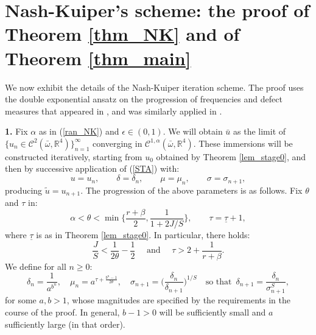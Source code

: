 \documentclass[reqno,twoside,11pt]{amsart}
\newcommand{\R}{\mathbb{R}}
\numberwithin{equation}{section}
\theoremstyle{plain}
\theoremstyle{definition}
\begin{document}
\section{Nash-Kuiper's scheme: the proof of Theorem \ref{thm_NK} and
  of Theorem \ref{thm_main}} \label{section_NK}

We now exhibit the details of the Nash-Kuiper iteration
scheme. The proof uses the double exponential ansatz on the progression of
frequencies and defect measures that appeared in \cite{DIS1/5},
and was similarly applied in \cite[proof of Theorem 1.1]{CHI2}.

\medskip


\smallskip

{\bf 1.} Fix $\alpha$ as in (\ref{ran_NK}) and $\epsilon \in (0,1)$. 
We will obtain $\bar u$ as the limit of 
$\{u_n\in\mathcal{C}^{2}(\bar\omega,\R^4)\}_{n=1}^\infty$ converging in
$\mathcal{C}^{1,\alpha}(\bar\omega,\R^4)$. These immersions will be constructed iteratively,
starting from $u_0$ obtained by Theorem
\ref{lem_stage0}, and then by successive application of (\ref{STA}) with:
$$u=u_{n},\qquad \delta =\delta_n, \qquad\mu=\mu_n, \qquad\sigma=\sigma_{n+1},$$
producing $\tilde u = u_{n+1}$. The progression of the above
parameters is as follows. Fix $\theta$ and $\tau$ in:
\begin{equation}\label{th_t}
\alpha<\theta<\min\Big\{\frac{r+\beta}{2}, \frac{1}{1+
  2J/S}\Big\},\qquad \tau = \underline\tau + 1,
\end{equation}
where $\underline\tau$ is as in Theorem \ref{lem_stage0}. In
particular, there holds:
\begin{equation}\label{ko1}
\frac{J}{S}<\frac{1}{2\theta} - \frac{1}{2} \quad \mbox{ and }\quad \tau>2+\frac{1}{r+\beta}.
\end{equation}
We define for all $n\geq 0$:
\begin{equation}\label{ko2}
\delta_n =\frac{1}{a^{b^n}},\quad \mu_n = a^{\tau+\frac{b^n-1}{2
    \theta}},\quad \sigma_{n+1} =
\Big(\frac{\delta_n}{\delta_{n+1}}\Big)^{1/S} \quad\mbox{so that }\,
\delta_{n+1} = \frac{\delta_n}{\sigma_{n+1}^S},
\end{equation}
for some  $a,b>1$, whose magnitudes are specified by the
requirements in the course of the proof. In general, $b-1>0$ will be 
sufficiently small and $a$ sufficiently large (in that order).

\smallskip
\end{document}
